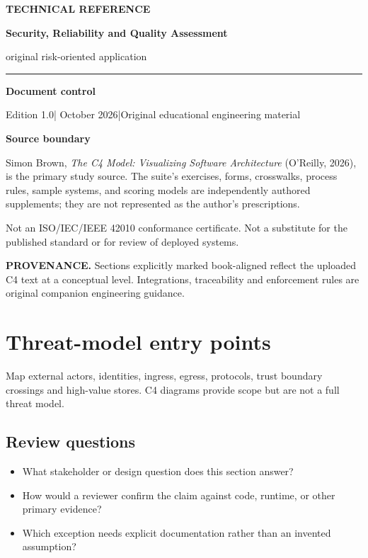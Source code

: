 \documentclass[10pt,letterpaper]{article}
\newcommand{\SourceNote}[1]{\par\smallskip\noindent\colorbox{C4Light}{\parbox{0.94\linewidth}{\footnotesize\textbf{PROVENANCE.} #1}}\par\medskip}
\newcommand{\DocStart}[3]{%
\begin{document}
\begin{titlepage}
\renewcommand{\thepage}{title-\arabic{page}}
\vspace*{0.55in}
{\sffamily\bfseries\small\color{C4Teal}#1}\par\vspace{0.24in}
{\sffamily\bfseries\fontsize{26}{31}\selectfont\color{C4Navy}#2}\par\vspace{0.18in}
{\large\color{C4Gray}#3}\par\vspace{0.4in}
\textcolor{C4Teal}{\rule{\linewidth}{1.15pt}}\par\vspace{0.24in}
\textbf{Document control}\par
Edition 1.0\quad|\quad 30 October 2026\quad|\quad Original educational engineering material\par
\vspace{0.17in}
\textbf{Source boundary}\par
Simon Brown, \emph{The C4 Model: Visualizing Software Architecture} (O'Reilly, 2026), is the primary study source. The suite's exercises, forms, crosswalks, process rules, sample systems, and scoring models are independently authored supplements; they are not represented as the author's prescriptions.\par
\vfill
{\small\color{C4Gray}Not an ISO/IEC/IEEE 42010 conformance certificate. Not a substitute for the published standard or for review of deployed systems.}\par
\end{titlepage}
}
\DocStart{TECHNICAL REFERENCE}{Security, Reliability and Quality Assessment}{original risk-oriented application}
\tableofcontents\clearpage
\SourceNote{Sections explicitly marked book-aligned reflect the uploaded C4 text at a conceptual level. Integrations, traceability and enforcement rules are original companion engineering guidance.}
\section{Threat-model entry points}
Map external actors, identities, ingress, egress, protocols, trust boundary crossings and high-value stores. C4 diagrams provide scope but are not a full threat model.


\subsection{Review questions}
\begin{itemize}
\item What stakeholder or design question does this section answer?
\item How would a reviewer confirm the claim against code, runtime, or other primary evidence?
\item Which exception needs explicit documentation rather than an invented assumption?
\end{itemize}
\end{document}
